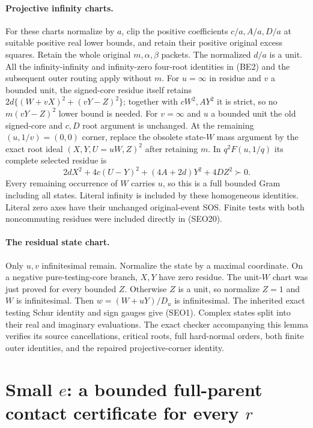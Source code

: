 \paragraph{Projective infinity charts.}
For these charts normalize by $a$, clip the positive coefficients
$c/a,A/a,D/a$ at suitable positive real lower bounds, and retain
their positive original excess squares. Retain the whole original
$m,\alpha,\beta$ packets. The normalized $d/a$ is a unit.
All the infinity-infinity and infinity-zero four-root identities
in (BE2) and the subsequent outer routing apply without $m$.
For $u=\infty$ in residue and $v$ a bounded unit, the signed-core
residue itself retains
$2d\{(W+vX)^2+(vY-Z)^2\}$; together with $cW^2,AY^2$ it is
strict, so no $m(vY-Z)^2$ lower bound is needed.
For $v=\infty$ and $u$ a bounded unit the old signed-core and
$c,D$ root argument is unchanged.
At the remaining $(u,1/v)=(0,0)$ corner, replace the obsolete
state-$W$ mass argument by the exact root ideal
$(X,Y,U=uW,Z)^2$ after retaining $m$. In $q^2F(u,1/q)$ its
complete selected residue is
\[
 2dX^2+4c(U-Y)^2+(4A+2d)Y^2+4DZ^2\succ0.
 \tag{SEO19}
\]
Every remaining occurrence of $W$ carries $u$, so this is a full
bounded Gram including all states. Literal infinity is included
by these homogeneous identities. Literal zero axes have their
unchanged original-event SOS. Finite tests with both noncommuting
residues were included directly in (SEO20).

\paragraph{The residual state chart.}
Only $u,v$ infinitesimal remain. Normalize the state by a maximal
coordinate. On a negative pure-testing-core branch, $X,Y$ have
zero residue. The unit-$W$ chart was just proved for every bounded
$Z$. Otherwise $Z$ is a unit, so normalize $Z=1$ and $W$ is
infinitesimal. Then $w=(W+uY)/D_u$ is infinitesimal. The inherited
exact testing Schur identity and sign gauges give (SEO1).
Complex states split into their real and imaginary evaluations.
The exact checker accompanying this lemma verifies its source
cancellations, critical roots, full hard-normal orders, both finite
outer identities, and the repaired projective-corner identity.


\section{\texorpdfstring{Small $e$: a bounded full-parent contact certificate for every $r$}{Small e: a bounded full-parent contact certificate for every r}}
\label{component:pa7e744614f49}


